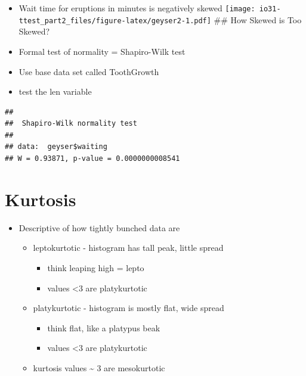 \documentclass[
]{book}
\newenvironment{Shaded}{\begin{snugshade}}{\end{snugshade}}
\newcommand{\KeywordTok}[1]{\textcolor[rgb]{0.13,0.29,0.53}{\textbf{#1}}}
\newcommand{\NormalTok}[1]{#1}
\newcommand{\OperatorTok}[1]{\textcolor[rgb]{0.81,0.36,0.00}{\textbf{#1}}}
\providecommand{\tightlist}{%
  \setlength{\itemsep}{0pt}\setlength{\parskip}{0pt}}
\begin{document}
\begin{itemize}
\tightlist
\item
  Wait time for eruptions in minutes is negatively skewed
  \texttt{[image: io31-ttest\_part2\_files/figure-latex/geyser2-1.pdf]}
  \#\# How Skewed is Too Skewed?
\item
  Formal test of normality = Shapiro-Wilk test
\item
  Use base data set called ToothGrowth
\item
  test the len variable
\end{itemize}

\begin{Shaded}
\end{Shaded}

\begin{verbatim}
## 
##  Shapiro-Wilk normality test
## 
## data:  geyser$waiting
## W = 0.93871, p-value = 0.0000000008541
\end{verbatim}

\hypertarget{kurtosis}{%
\section{Kurtosis}\label{kurtosis}}

\begin{itemize}
\tightlist
\item
  Descriptive of how tightly bunched data are

  \begin{itemize}
  \tightlist
  \item
    leptokurtotic - histogram has tall peak, little spread

    \begin{itemize}
    \tightlist
    \item
      think leaping high = lepto
    \item
      values \textless3 are platykurtotic
    \end{itemize}
  \item
    platykurtotic - histogram is mostly flat, wide spread

    \begin{itemize}
    \tightlist
    \item
      think flat, like a platypus beak
    \item
      values \textless3 are platykurtotic
    \end{itemize}
  \item
    kurtosis values \textasciitilde{} 3 are mesokurtotic
  \end{itemize}
\end{itemize}
\end{document}
